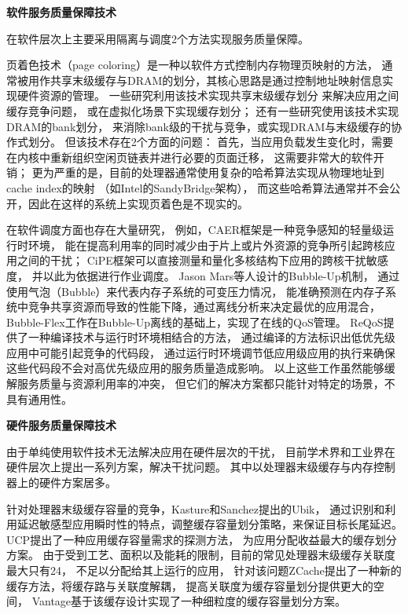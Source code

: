 \textbf{软件服务质量保障技术}\quad

在软件层次上主要采用隔离与调度2个方法实现服务质量保障。

%
%

页着色技术（page coloring）是一种以软件方式控制内存物理页映射的方法，
通常被用作共享末级缓存与DRAM的划分，其核心思路是通过控制地址映射信息实现硬件资源的管理。
一些研究利用该技术实现共享末级缓存划分\cite{lin_gaining_2008, tam_managing_2007}
来解决应用之间缓存竞争问题，
或在虚拟化场景下实现缓存划分\cite{Jin2009, Chen2010, Wang2012}；
还有一些研究\cite{liu_software_2012}使用该技术实现DRAM的bank划分，
来消除bank级的干扰与竞争，或实现DRAM与末级缓存的协作式划分\cite{Liu:2014:ISCA}。
但该技术存在2个方面的问题：
首先，当应用负载发生变化时，需要在内核中重新组织空闲页链表并进行必要的页面迁移，
这需要非常大的软件开销；
更为严重的是，目前的处理器通常使用复杂的哈希算法实现从物理地址到cache index的映射
（如Intel的SandyBridge架构），
而这些哈希算法通常并不会公开，因此在这样的系统上实现页着色是不现实的。

在软件调度方面也存在大量研究，
例如，CAER框架\cite{mars_contention_2010}是一种竞争感知的轻量级运行时环境，
能在提高利用率的同时减少由于片上或片外资源的竞争所引起跨核应用之间的干扰；
CiPE框架\cite{mars_directly_2011}可以直接测量和量化多核结构下应用的跨核干扰敏感度，
并以此为依据进行作业调度。
Jason Mars等人设计的Bubble-Up\cite{mars_bubble-up:_2011}机制，
通过使用气泡（Bubble）来代表内存子系统的可变压力情况，
能准确预测在内存子系统中竞争共享资源而导致的性能下降，通过离线分析来决定最优的应用混合，
Bubble-Flex\cite{yang_bubble-flux:_2013}工作在Bubble-Up离线的基础上，实现了在线的QoS管理。
ReQoS\cite{tang_reqos:_2013}提供了一种编译技术与运行时环境相结合的方法，
通过编译的方法标识出低优先级应用中可能引起竞争的代码段，
通过运行时环境调节低应用级应用的执行来确保这些代码段不会对高优先级应用的服务质量造成影响。
以上这些工作虽然能够缓解服务质量与资源利用率的冲突，
但它们的解决方案都只能针对特定的场景，不具有通用性。


\textbf{硬件服务质量保障技术}\quad

由于单纯使用软件技术无法解决应用在硬件层次的干扰，
目前学术界和工业界在硬件层次上提出一系列方案，解决干扰问题。
其中以处理器末级缓存与内存控制器上的硬件方案居多。

针对处理器末级缓存容量的竞争，Kasture和Sanchez提出的Ubik\cite{kasture_ubik:_2014}，
通过识别和利用延迟敏感型应用瞬时性的特点，调整缓存容量划分策略，来保证目标长尾延迟。
UCP\cite{qureshi_utility-based_2006}提出了一种应用缓存容量需求的探测方法，
为应用分配收益最大的缓存划分方案。
由于受到工艺、面积以及能耗的限制，目前的常见处理器末级缓存关联度最大只有24，
不足以分配给其上运行的应用，
针对该问题ZCache\cite{sanchez_zcache:_2010}提出了一种新的缓存方法，将缓存路与关联度解耦，
提高关联度为缓存容量划分提供更大的空间，
Vantage\cite{sanchez_vantage:_2011}基于该缓存设计实现了一种细粒度的缓存容量划分方案。

